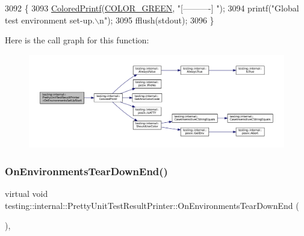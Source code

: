 \begin{DoxyCode}
3092                        \{
3093   \hyperlink{namespacetesting_1_1internal_adef3055706176001364e54eb73a87e31}{ColoredPrintf}(\hyperlink{namespacetesting_1_1internal_a648c1bc94c2ef9e868ff3f9dff0f9c4ea3b1e81f5b14a17b35a8672d57d166507}{COLOR\_GREEN},  \textcolor{stringliteral}{"[----------] "});
3094   printf(\textcolor{stringliteral}{"Global test environment set-up.\(\backslash\)n"});
3095   fflush(stdout);
3096 \}
\end{DoxyCode}
Here is the call graph for this function\+:
\nopagebreak
\begin{figure}[H]
\begin{center}
\leavevmode
\includegraphics[width=350pt]{classtesting_1_1internal_1_1PrettyUnitTestResultPrinter_a846a5e82b421e04fcdd2b1b2b64b162f_cgraph}
\end{center}
\end{figure}
\mbox{\label{classtesting_1_1internal_1_1PrettyUnitTestResultPrinter_ab23094ef3b714778b2f742d39818c280}} 
\subsubsection{\texorpdfstring{On\+Environments\+Tear\+Down\+End()}{OnEnvironmentsTearDownEnd()}}
{\footnotesize\ttfamily virtual void testing\+::internal\+::\+Pretty\+Unit\+Test\+Result\+Printer\+::\+On\+Environments\+Tear\+Down\+End (\begin{DoxyParamCaption}\item[{const \hyperlink{classtesting_1_1UnitTest}{Unit\+Test} \&}]{ }\end{DoxyParamCaption})\hspace{0.3cm}{\ttfamily [inline]}, {\ttfamily [virtual]}}



